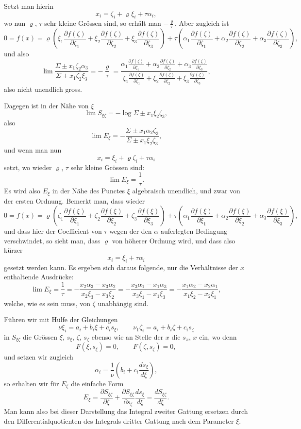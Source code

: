 \documentclass[10pt]{article}
\begin{document}
Setzt man hierin
\[
x_i=\zeta_i+\varrho\xi_i+\tau\alpha_i,
\]
wo nun $\varrho$, $\tau$ sehr kleine Grössen sind, so erhält man $-\frac{\varrho}{\tau}$. Aber zugleich ist
\[
0=f(x)=\varrho\left(\xi_1\frac{\partial f(\zeta)}{\partial \zeta_1}+\xi_2\frac{\partial f(\zeta)}{\partial \zeta_2}+\xi_3\frac{\partial f(\zeta)}{\partial \zeta_3}\right)
+\tau\left(\alpha_1\frac{\partial f(\zeta)}{\partial \zeta_1}+\alpha_2\frac{\partial f(\zeta)}{\partial \zeta_2}+\alpha_3\frac{\partial f(\zeta)}{\partial \zeta_3}\right),
\]
und also
\[
\lim\frac{\Sigma\pm x_1\zeta_2\alpha_3}{\Sigma\pm x_1\zeta_2\xi_3}
=-\frac{\varrho}{\tau}
=\frac{\alpha_1\frac{\partial f(\zeta)}{\partial \zeta_1}+\alpha_2\frac{\partial f(\zeta)}{\partial \zeta_2}+\alpha_3\frac{\partial f(\zeta)}{\partial \zeta_3}}
{\xi_1\frac{\partial f(\zeta)}{\partial \zeta_1}+\xi_2\frac{\partial f(\zeta)}{\partial \zeta_2}+\xi_3\frac{\partial f(\zeta)}{\partial \zeta_3}},
\]
also nicht unendlich gross.

Dagegen ist in der Nähe von $\xi$
\[
\lim S_{\xi\zeta}=-\log\Sigma\pm x_1\xi_2\zeta_3,
\]
also
\[
\lim E_\xi=-\frac{\Sigma\pm x_1\alpha_2\zeta_3}{\Sigma\pm x_1\xi_2\zeta_3},
\]
und wenn man nun
\[
x_i=\xi_i+\varrho\zeta_i+\tau\alpha_i
\]
setzt, wo wieder $\varrho$, $\tau$ sehr kleine Grössen sind:
\[
\lim E_\xi=\frac{1}{\tau}.
\]
Es wird also $E_\xi$ in der Nähe des Punctes $\xi$ algebraisch unendlich, und zwar von der ersten Ordnung. Bemerkt man, dass wieder
\[
0=f(x)=\varrho\left(\zeta_1\frac{\partial f(\xi)}{\partial \xi_1}+\zeta_2\frac{\partial f(\xi)}{\partial \xi_2}+\zeta_3\frac{\partial f(\xi)}{\partial \xi_3}\right)
+\tau\left(\alpha_1\frac{\partial f(\xi)}{\partial \xi_1}+\alpha_2\frac{\partial f(\xi)}{\partial \xi_2}+\alpha_3\frac{\partial f(\xi)}{\partial \xi_3}\right),
\]
und dass hier der Coefficient von $\tau$ wegen der den $\alpha$ auferlegten Bedingung verschwindet, so sieht man, dass $\varrho$ von höherer Ordnung wird, und dass also kürzer
\[
x_i=\xi_i+\tau\alpha_i
\]
gesetzt werden kann. Es ergeben sich daraus folgende, nur die Verhältnisse der $x$ enthaltende Ausdrücke:
\[
\lim E_\xi=\frac{1}{\tau}
=-\frac{x_2\alpha_3-x_3\alpha_2}{x_2\xi_3-x_3\xi_2}
=-\frac{x_3\alpha_1-x_1\alpha_3}{x_3\xi_1-x_1\xi_3}
=-\frac{x_1\alpha_2-x_2\alpha_1}{x_1\xi_2-x_2\xi_1},
\]
welche, wie es sein muss, von $\zeta$ unabhängig sind.

Führen wir mit Hülfe der Gleichungen
\[
\nu\xi_i=a_i+b_i\xi+c_is_\xi,
\qquad
\nu_1\zeta_i=a_i+b_i\zeta+c_is_\zeta
\]
in $S_{\xi\zeta}$ die Grössen $\xi$, $s_\xi$, $\zeta$, $s_\zeta$ ebenso wie an Stelle der $x$ die $s_x$, $x$ ein, wo denn
\[
F(\xi,s_\xi)=0,
\qquad
F(\zeta,s_\zeta)=0,
\]
und setzen wir zugleich
\[
\alpha_i=\frac{1}{\nu}\left(b_i+c_i\frac{ds_\xi}{d\xi}\right),
\]
so erhalten wir für $E_\xi$ die einfache Form
\[
E_\xi=\frac{\partial S_{\xi\zeta}}{\partial \xi}+\frac{\partial S_{\xi\zeta}}{\partial s_\xi}\frac{ds_\xi}{d\xi}
=\frac{dS_{\xi\zeta}}{d\xi}.
\]
Man kann also bei dieser Darstellung das Integral zweiter Gattung ersetzen durch den Differentialquotienten des Integrals dritter Gattung nach dem Parameter $\xi$.
\end{document}
